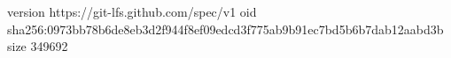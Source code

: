 version https://git-lfs.github.com/spec/v1
oid sha256:0973bb78b6de8eb3d2f944f8ef09edcd3f775ab9b91ec7bd5b6b7dab12aabd3b
size 349692
